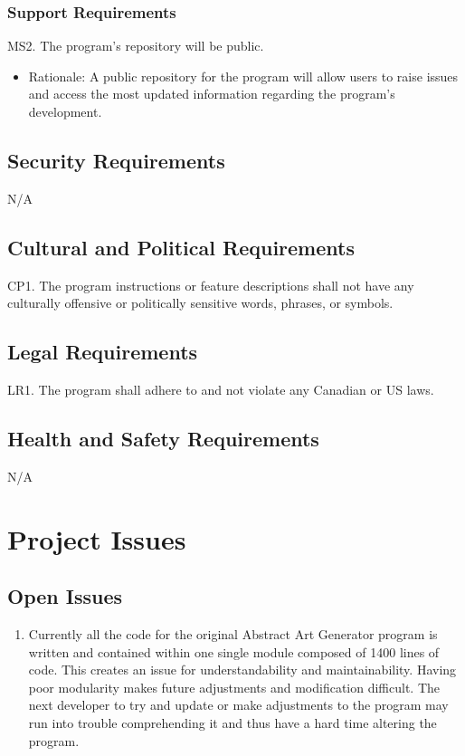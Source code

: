 \documentclass[12pt, titlepage]{article}
\begin{document}
\subsubsection{Support Requirements}
MS2. The program's repository will be public.
\begin{itemize}
    \item Rationale: A public repository for the program will allow users to raise issues and access the most updated information regarding the program's development.
\end{itemize}

\subsection{Security Requirements}
N/A
\subsection{Cultural and Political Requirements}
CP1. The program instructions or feature descriptions shall not have any culturally offensive or politically sensitive words, phrases, or symbols.


\subsection{Legal Requirements}
LR1. The program shall adhere to and not violate any Canadian or US laws.

\subsection{Health and Safety Requirements}
N/A

\section{Project Issues}

\subsection{Open Issues}

\begin{enumerate}[start=1,label={Issue \arabic*.}]
    \item Currently all the code for the original Abstract Art Generator program is written and contained within one single module composed of 1400 lines of code. This creates an issue for understandability and maintainability. Having poor modularity makes future adjustments and modification difficult. The next developer to try and update or make adjustments to the program may run into trouble comprehending it and thus have a hard time altering the program. 
\end{enumerate}
\end{document}
